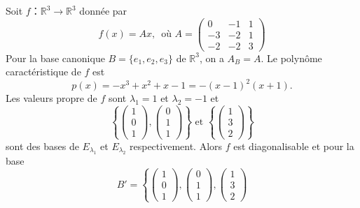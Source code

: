 \begin{example}
  \label{exe:30}
  Soit $f： ℝ^3 → ℝ^3$ donnée par
  \begin{displaymath}
      f(x) = Ax, \, \text{ où }      A =  \begin{pmatrix}
        0 & -1 & 1 \\
        -3 & -2 & 1 \\
        -2 & -2 & 3
      \end{pmatrix}      
    \end{displaymath}
    Pour la base canonique  $B = \{e_1,e_2,e_3\}$ de $ℝ^3$, on a $A_B =A$. Le polynôme caractéristique de $f$ est
    \begin{displaymath}
      p(x) = -x^3 + x^2 + x -1 = - (x-1)^2 (x+1). 
    \end{displaymath}
    Les valeurs propre de $f$ sont $λ_1 = 1$ et $λ_2 = -1$ et
    \begin{displaymath}
      \left\{
          \begin{pmatrix}
            1 \\ 0 \\1
          \end{pmatrix},
          \begin{pmatrix}
            0 \\ 1 \\ 1
          \end{pmatrix} \right\} \text{ et }  \left\{
          \begin{pmatrix}
            1 \\ 3 \\2
          \end{pmatrix} \right\}
    \end{displaymath}
    sont des bases de $E_{λ_1}$ et  $E_{λ_2}$  respectivement. Alors $f$ est diagonalisable et pour la base
    \begin{displaymath}
      B' =  \left\{
          \begin{pmatrix}
            1 \\ 0 \\1
          \end{pmatrix},
          \begin{pmatrix}
            0 \\ 1 \\ 1
          \end{pmatrix}, 
          \begin{pmatrix}
            1 \\ 3 \\2

\end{pmatrix}
\end{displaymath}
\end{example}
